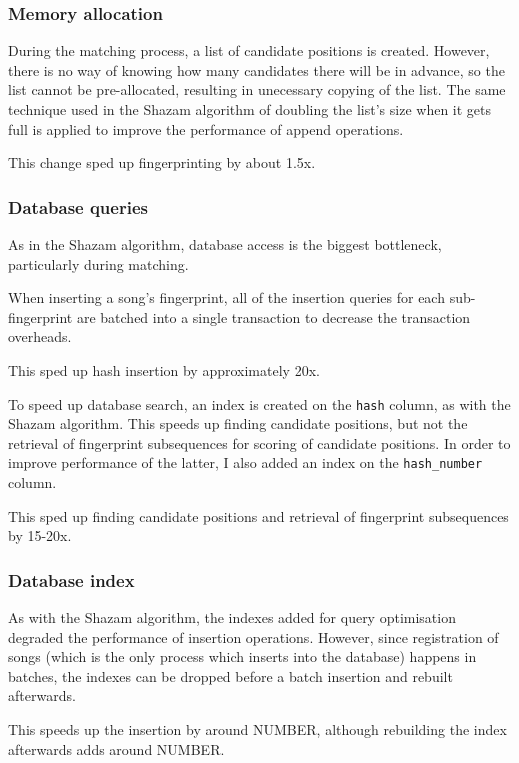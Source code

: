 \documentclass[12pt,a4paper,twoside,openright]{report}
\begin{document}
\subsubsection{Memory allocation}

During the matching process, a list of candidate positions is created. However, there is no way of knowing how many candidates there will be in advance, so the list cannot be pre-allocated, resulting in unecessary copying of the list. The same technique used in the Shazam algorithm of doubling the list's size when it gets full is applied to improve the performance of append operations.

This change sped up fingerprinting by about 1.5x.

\subsubsection{Database queries}

As in the Shazam algorithm, database access is the biggest bottleneck, particularly during matching.

When inserting a song's fingerprint, all of the insertion queries for each sub-fingerprint are batched into a single transaction to decrease the transaction overheads.

This sped up hash insertion by approximately 20x.

To speed up database search, an index is created on the \lstinline{hash} column, as with the Shazam algorithm. This speeds up finding candidate positions, but not the retrieval of fingerprint subsequences for scoring of candidate positions. In order to improve performance of the latter, I also added an index on the \lstinline{hash_number} column.

This sped up finding candidate positions and retrieval of fingerprint subsequences by 15-20x.


\subsubsection{Database index}

As with the Shazam algorithm, the indexes added for query optimisation degraded the performance of insertion operations. However, since registration of songs (which is the only process which inserts into the database) happens in batches, the indexes can be dropped before a batch insertion and rebuilt afterwards.

This speeds up the insertion by around NUMBER, although rebuilding the index afterwards adds around NUMBER.
\end{document}
